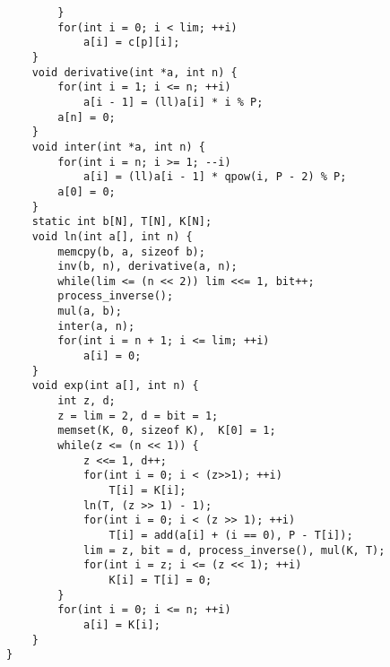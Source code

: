 \begin{verbatim}
        }  
        for(int i = 0; i < lim; ++i)  
            a[i] = c[p][i];  
    }  
    void derivative(int *a, int n) {  
        for(int i = 1; i <= n; ++i)  
            a[i - 1] = (ll)a[i] * i % P;  
        a[n] = 0;  
    }  
    void inter(int *a, int n) {  
        for(int i = n; i >= 1; --i)  
            a[i] = (ll)a[i - 1] * qpow(i, P - 2) % P;  
        a[0] = 0;  
    }  
    static int b[N], T[N], K[N];  
    void ln(int a[], int n) {  
        memcpy(b, a, sizeof b);  
        inv(b, n), derivative(a, n);  
        while(lim <= (n << 2)) lim <<= 1, bit++;  
        process_inverse();  
        mul(a, b);  
        inter(a, n);  
        for(int i = n + 1; i <= lim; ++i)  
            a[i] = 0;  
    }  
    void exp(int a[], int n) {  
        int z, d;  
        z = lim = 2, d = bit = 1;  
        memset(K, 0, sizeof K),  K[0] = 1;  
        while(z <= (n << 1)) {  
            z <<= 1, d++;  
            for(int i = 0; i < (z>>1); ++i)   
                T[i] = K[i];  
            ln(T, (z >> 1) - 1);  
            for(int i = 0; i < (z >> 1); ++i)  
                T[i] = add(a[i] + (i == 0), P - T[i]);  
            lim = z, bit = d, process_inverse(), mul(K, T);  
            for(int i = z; i <= (z << 1); ++i)  
                K[i] = T[i] = 0;  
        }  
        for(int i = 0; i <= n; ++i)  
            a[i] = K[i];
    }  
}  

\end{verbatim}
